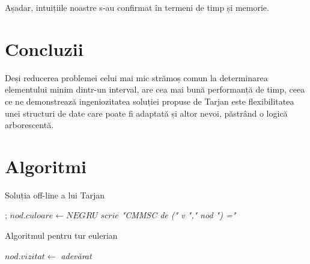 \documentclass[runningheads]{llncs}
\begin{document}
Așadar, intuițiile noastre s-au confirmat în termeni de timp și memorie.

\section{Concluzii}

Deși reducerea problemei celui mai mic strămoș comun la determinarea elementului minim dintr-un interval, are cea mai bună performanță de timp, ceea ce ne demonstrează ingeniozitatea soluției propuse de Tarjan este flexibilitatea unei structuri de date care poate fi adaptată și altor nevoi, păstrând o logică arborescentă.

\newpage

\section{Algoritmi}

\begin{algorithm}
\caption{Soluția off-line a lui Tarjan}\label{tarjan}
\begin{algorithmic}[1]
    \State {}
        \State {}
        \State {}
        \State {};
    \EndFor
    \State $nod.culoare \gets NEGRU$
            \State \textbf{$scrie$} \emph{"CMMSC de (" v "," nod ") ="} 
        \EndIf
    \EndFor
\EndProcedure
\end{algorithmic}
\end{algorithm}

\begin{algorithm}
\caption{Algoritmul pentru tur eulerian}\label{tur_eulerian}
\begin{algorithmic}[1]
    \State $nod.vizitat \gets$ \emph{adevărat}
    \State {}
        	\State {}
            \State {}
        \EndIf
    \EndFor
\EndProcedure
\end{algorithmic}
\end{algorithm}
\end{document}
